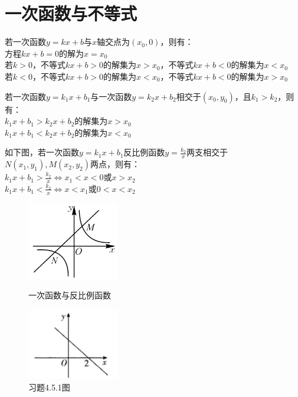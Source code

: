 \documentclass{ecnuthesis}
\begin{document}
\section{一次函数与不等式}
\begin{knowledge}
    若一次函数$y=kx+b$与$x$轴交点为$(x_0,0)$，则有： \\
    方程$kx+b=0$的解为$x=x_0$ \\
    若$k>0$，不等式$kx+b>0$的解集为$x>x_0$，不等式$kx+b<0$的解集为$x<x_0$ \\
    若$k<0$，不等式$kx+b>0$的解集为$x<x_0$，不等式$kx+b<0$的解集为$x>x_0$
\end{knowledge}
\begin{knowledge}
    若一次函数$y=k_1x+b_1$与一次函数$y=k_2x+b_2$相交于$(x_0,y_0)$，且$k_1>k_2$，则有： \\
    $k_1x+b_1>k_2x+b_2$的解集为$x>x_0$ \\
    $k_1x+b_1<k_2x+b_2$的解集为$x<x_0$
\end{knowledge}
\begin{knowledge}
    如下图，若一次函数$y=k_1x+b_1$反比例函数$y=\frac{k_2}{x}$两支相交于$N(x_1,y_1),M(x_2,y_2)$两点，则有：\\
    $k_1x+b_1>\frac{k_2}{x} \Leftrightarrow x_1<x<0$或$x>x_2$\\
    $k_1x+b_1<\frac{k_2}{x} \Leftrightarrow x<x_1$或$0<x<x_2$
\end{knowledge}
\begin{figure}[ht]
\centering
\begin{minipage}[t]{0.48\textwidth}
\centering
\includegraphics[width=4cm]{picture/4_5_1.png}
\caption{一次函数与反比例函数}
\end{minipage}
\begin{minipage}[t]{0.48\textwidth}
\centering
\includegraphics[width=4cm]{picture/4_5_2.png}
\caption{习题4.5.1图}
\end{minipage}
\end{figure}
\end{document}
